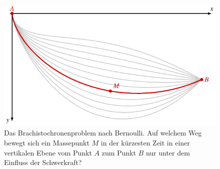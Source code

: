 %
%
%
\begin{figure}
\centering
\includegraphics{chapters/020-variation/images/bernoulli.pdf}
\caption{Das Brachistochronenproblem nach Bernoulli.
Auf welchem Weg bewegt sich ein Massepunkt $M$ in der kürzesten
Zeit in einer vertikalen Ebene vom Punkt $A$ zum Punkt $B$ nur unter
dem Einfluss der Schwerkraft?
\label{buch:variation:problem:fig:bernoulli}}
\end{figure}
